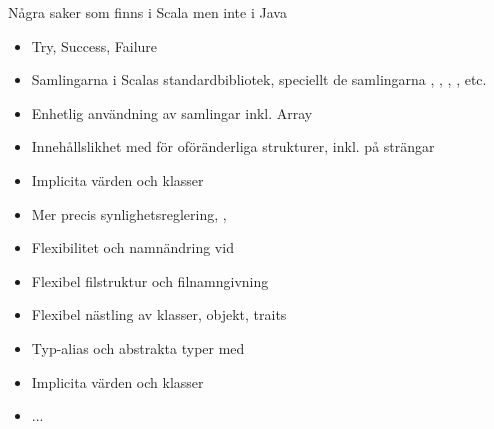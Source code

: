 \begin{Slide}{Några saker som finns i Scala men inte i Java}
\begin{multicols}{2}
\begin{itemize}
\item Try, Success, Failure

\item Samlingarna i Scalas standardbibliotek, speciellt de  samlingarna , , , , etc.

\item Enhetlig användning av samlingar inkl. Array

\item Innehållslikhet med \code{==} för oföränderliga strukturer, inkl. \code{< <= > >= } på strängar

\item Implicita värden och klasser

\item Mer precis synlighetsreglering, , 

\item Flexibilitet och namnändring vid 

\item Flexibel filstruktur och filnamngivning

\item Flexibel nästling av klasser, objekt, traits

\item Typ-alias och abstrakta typer med 

\item Implicita värden och klasser

\item ...
\end{itemize}
\end{multicols}
\end{Slide}


